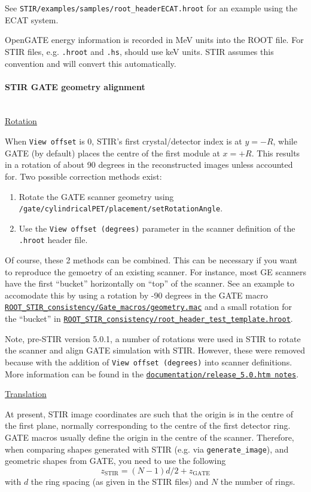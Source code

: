 \documentclass{article}
\def\url#1#2{\mbox{\href{#1}{\tt #2}}}
\newcommand{\subsubsubsection}[1]{\paragraph{#1}\mbox{} \\}
\begin{document}
See \texttt{STIR/examples/samples/root\_headerECAT.hroot} for an example using the ECAT system.

OpenGATE energy information is recorded in MeV units into the ROOT file.
For STIR files, e.g. \texttt{.hroot} and \texttt{.hs}, should use keV units.
STIR assumes this convention and will convert this automatically.

\subsubsubsection{STIR GATE geometry alignment}

\noindent \underline{Rotation}

When \texttt{View offset} is 0, STIR's first crystal/detector index is at $y=-R$, while GATE (by default)
places the centre of the first module at $x=+R$.
This results in a rotation of about 90 degrees in the reconstructed images unless accounted for.
Two possible correction methods exist:
\begin{enumerate}
    \item Rotate the GATE scanner geometry using \texttt{/gate/cylindricalPET/placement/setRotationAngle}.
    \item Use the \texttt{View offset (degrees)} parameter in the scanner definition of the \texttt{.hroot} header file.
\end{enumerate}
Of course, these 2 methods can be combined. This can be necessary if you want to reproduce the
gemoetry of an existing scanner. For instance, most GE scanners have the first ``bucket''
horizontally on ``top'' of the scanner.
See an example to accomodate this by using a rotation by -90 degrees in the GATE macro
\url{https://github.com/UCL/STIR/blob/master/examples/ROOT_files/ROOT_STIR_consistency/Gate_macros/geometry.mac}{ROOT\_STIR\_consistency/Gate\_macros/geometry.mac}
and a small rotation for the ``bucket'' in
\url{https://github.com/UCL/STIR/blob/master/examples/ROOT_files/ROOT_STIR_consistency/root_header_test_template.hroot}{ROOT\_STIR\_consistency/root\_header\_test\_template.hroot}.
    
Note, pre-STIR version 5.0.1, a number of rotations were used in STIR to rotate the scanner and align GATE simulation
with STIR. However, these were removed because with the addition of \texttt{View offset (degrees)} into scanner definitions.
More information can be found in the
\url{http://stir.sourceforge.net/documentation/release_5.0.htm}{documentation/release\_5.0.htm notes}.

\noindent \underline{Translation}

At present, STIR image coordinates are such that the origin is in the centre of the first plane,
normally corresponding to the centre of the first detector ring. GATE macros usually
define the origin in the centre of the scanner. Therefore, when comparing shapes generated
with STIR (e.g. via  \texttt{generate\_image}), and geometric shapes from GATE, you need to use
the following
\begin{equation}
z_\textrm{STIR} = (N-1) d/2 + z_\textrm{GATE}
\end{equation}
\noindent
with $d$ the ring spacing (as given in the STIR files) and $N$ the number of rings.
\end{document}
